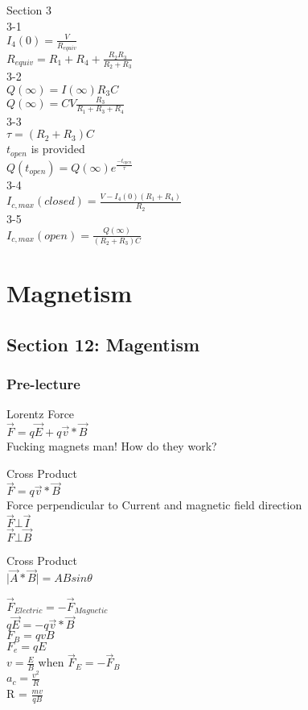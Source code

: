 \documentclass{article}
\begin{document}
\vspace{2mm}

\noindent
Section 3 \\
3-1 \\
$I_4(0) = \frac{V}{R_{equiv}}$ \\
$R_{equiv} = R_1 + R_4 + \frac{R_2 R_3}{R_2 + R_3}$ \\
3-2 \\
$Q(\infty) = I(\infty) R_3 C$ \\
$Q(\infty) = CV \frac{R_3}{R_1 + R_3 + R_4}$ \\
3-3 \\
$\tau = (R_2 + R_3) C$ \\
$t_{open}$ is provided \\
$Q(t_{open}) = Q(\infty) e^{\frac{-t_{open}}{\tau}}$ \\
3-4 \\
$I_{c,max}(closed) = \frac{V - I_4(0) (R_1 + R_4)}{R_2}$ \\
3-5 \\
$I_{c,max}(open) = \frac{Q(\infty)}{(R_2 + R_3) C}$

\noindent

\section{Magnetism}
\subsection{Section 12: Magentism}
\subsubsection{Pre-lecture}
\noindent
Lorentz Force \\
$\vec{F}=q \vec{E} + q \vec{v} * \vec{B} $ \\
Fucking magnets man! How do they work? 

\noindent
Cross Product \\
$\vec{F} = q \vec{v} * \vec{B}$ \\
Force perpendicular to Current and magnetic field direction\\
$\vec{F} \bot \vec{I}$ \\
$\vec{F} \bot \vec{B}$

\noindent 
Cross Product \\
$\vert \vec{A} * \vec{B} \vert = AB sin \theta$

\noindent
$\vec{F}_{Electric} = -\vec{F}_{Magnetic}$ \\
$q\vec{E} = -q\vec{v} * \vec{B}$ \\
$F_B = qvB$ \\
$F_e = qE$ \\
$v = \frac{E}{B}$ when $\vec{F}_E = -\vec{F}_B$ \\
$a_c = \frac{v^2}{R}$ \\
R = $\frac{mv}{qB}$
\end{document}
